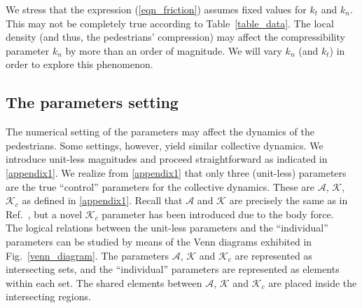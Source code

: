 \documentclass[preprint,12pt]{elsarticle}
\begin{document}
We stress that the expression (\ref{eqn_friction}) assumes fixed values for 
$k_t$ and $k_n$. This may not be completely true according to 
Table~\ref{table_data}. The local density (and thus, the pedestrians' 
compression) may affect the compressibility parameter $k_n$ by more than an order 
of magnitude. We will vary $k_n$ (and $k_t$) in order to explore this 
phenomenon. \\  


\subsection{\label{parameters}The parameters setting}

The numerical setting of the parameters may affect the dynamics of the 
pedestrians. Some settings, however, yield similar collective dynamics.
We introduce unit-less magnitudes 
and proceed straightforward as indicated in \ref{appendix1}. We realize from 
\ref{appendix1} that only three (unit-less) parameters  are the true 
``control'' parameters for the collective dynamics. These are $\mathcal{A}$, 
$\mathcal{K}$, $\mathcal{K}_c$ as defined in \ref{appendix1}. Recall that 
$\mathcal{A}$ and $\mathcal{K}$ are precisely the same as in 
Ref.~\cite{dorso_2019}, but a novel $\mathcal{K}_c$ parameter has been 
introduced due to the body force.   \\

The logical relations between the unit-less parameters and the ``individual'' 
parameters can be studied by means of the Venn diagrams exhibited in 
Fig.~\ref{venn_diagram}. The parameters $\mathcal{A}$, $\mathcal{K}$ and 
$\mathcal{K}_c$ are represented as intersecting sets, and the ``individual'' 
parameters are represented as elements within each set. The shared elements 
between $\mathcal{A}$, $\mathcal{K}$ and $\mathcal{K}_c$ are placed inside the 
intersecting regions. \\
\end{document}
